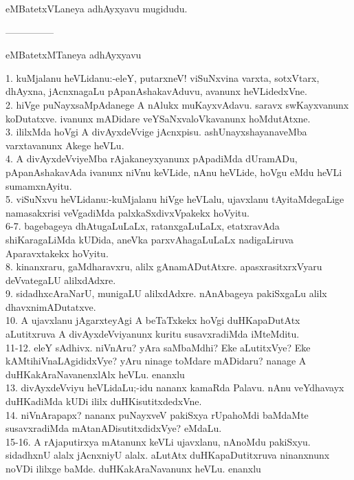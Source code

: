 \documentclass{article}
\begin{document}
\begin{center}
eMBatetxVLaneya adhAyxyavu mugidudu.
\end{center}

\begin{center}
---------------
\end{center}

\begin{center}
eMBatetxMTaneya adhAyxyavu
\end{center}

1. kuMjalanu heVLidanu:-eleY, putarxneV! viSuNxvina varxta, sotxVtarx, dhAyxna, jAcnxnagaLu pApanAshakavAduvu, avanunx heVLidedxVne.\\
2. hiVge puNayxsaMpAdanege A nAlukx muKayxvAdavu. saravx swKayxvanunx koDutatxve. ivanunx mADidare veYSaNxvaloVkavanunx hoMdutAtxne.\\
3. ililxMda  hoVgi A divAyxdeVvige jAcnxpisu. ashUnayxshayanaveMba varxtavanunx Akege heVLu.\\
4. A divAyxdeVviyeMba rAjakaneyxyanunx pApadiMda dUramADu, pApanAshakavAda ivanunx niVnu keVLide, nAnu heVLide, hoVgu eMdu heVLi sumamxnAyitu.\\
5. viSuNxvu heVLidanu:-kuMjalanu hiVge heVLalu, ujavxlanu tAyitaMdegaLige namasakxrisi veVgadiMda palxkaSxdivxVpakekx hoVyitu.\\
6-7. bagebageya dhAtugaLuLaLx, ratanxgaLuLaLx, etatxravAda shiKaragaLiMda kUDida, aneVka parxvAhagaLuLaLx nadigaLiruva Aparavxtakekx hoVyitu.\\
8. kinanxraru, gaMdharavxru, alilx gAnamADutAtxre. apasxrasitxrxVyaru deVvategaLU alilxdAdxre.\\
9. sidadhxcAraNarU, munigaLU alilxdAdxre. nAnAbageya pakiSxgaLu alilx dhavxnimADutatxve.\\
10. A ujavxlanu jAgarxteyAgi A beTaTxkekx hoVgi duHKapaDutAtx aLutitxruva A divAyxdeVviyanunx kuritu susavxradiMda iMteMditu.\\
11-12. eleY sAdhivx. niVnAru? yAra saMbaMdhi? Eke aLutitxVye? Eke kAMtihiVnaLAgididxVye? yAru ninage toMdare mADidaru? nanage A duHKakAraNavanenxlAlx heVLu. enanxlu\\
13. divAyxdeVviyu heVLidaLu;-idu nananx kamaRda Palavu. nAnu veYdhavayx duHKadiMda kUDi ililx duHKisutitxdedxVne.\\
14. niVnArapapx? nananx puNayxveV pakiSxya rUpahoMdi baMdaMte susavxradiMda mAtanADisutitxdidxVye? eMdaLu.\\
15-16. A rAjaputirxya mAtanunx keVLi ujavxlanu, nAnoMdu pakiSxyu. sidadhxnU alalx jAcnxniyU alalx. aLutAtx duHKapaDutitxruva ninanxnunx noVDi ililxge baMde. duHKakAraNavanunx heVLu. enanxlu\\
\end{document}
